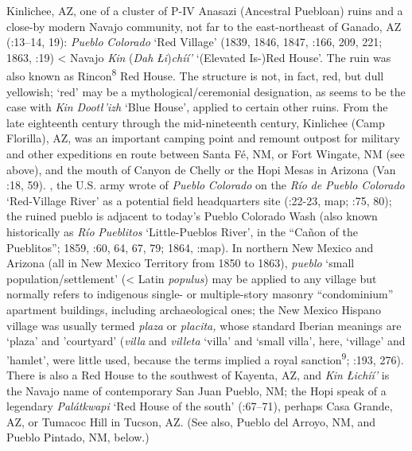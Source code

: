 Kinlichee, AZ, one of a cluster of P-IV Anasazi (Ancestral Puebloan) ruins and a close-by modern Navajo community, not far to the east-northeast of Ganado, AZ (\citealt{BarnesGranger1960}:13–14, 19):  \textit{Pueblo} \textit{Colorado} ‘Red Village’ (1839, 1846, 1847, \citealt{Correll1979}:166, 209, 221; 1863, \citealt{BarnesGranger1960}:19) < Navajo \textit{Kin} (\textit{Dah} \textit{Łi})\textit{chíí'} ‘(Elevated Is-)Red House’.  The ruin was also known as Rincon\textsuperscript{8} Red House.  The structure is not, in fact, red, but dull yellowish; ‘red’ may be a mythological/ceremonial designation, as seems to be the case with \textit{Kin} \textit{Dootł’izh} ‘Blue House’, applied to certain other ruins.  From the late eighteenth century through the mid-nineteenth century, Kinlichee (Camp Florilla), AZ, was an important camping point and remount outpost for military and other expeditions en route between Santa Fé, NM, or Fort Wingate, NM (see above), and the mouth of Canyon de Chelly or the Hopi Mesas in Arizona (Van \citealt{Valkenburgh1999}:18, 59).  \citealt{In1863}, the U.S. army wrote of \textit{Pueblo} \textit{Colorado} on the \textit{Río} \textit{de} \textit{Pueblo} \textit{Colorado} ‘Red-Village River’ as a potential field headquarters site (\citealt{Kelly1970}:22-23, map; \citealt{Trafzer1982}:75, 80); the ruined pueblo is adjacent to today’s Pueblo Colorado Wash (also known historically as \textit{Río} \textit{Pueblitos} ‘Little-Pueblos River’, in the “Cañon of the Pueblitos”; 1859, \citealt{Bailey1964a}:60, 64, 67, 79; 1864, \citealt{Madsen2010}:map).  In northern New Mexico and Arizona (all in New Mexico Territory from 1850 to 1863), \textit{pueblo} ‘small population/settlement’ (< Latin \textit{populus}) may be applied to any village but normally refers to indigenous single- or multiple-story masonry “condominium” apartment buildings, including archaeological ones; the New Mexico Hispano village was usually termed \textit{plaza} or \textit{placita,} whose standard Iberian meanings are ‘plaza’ and ’courtyard’ (\textit{villa} and \textit{villeta} ‘villa’ and ‘small villa’, here, ‘village’ and ’hamlet’, were little used, because the terms implied a royal sanction\textsuperscript{9}; \citealt{Julyan1998}:193, 276).  There is also a Red House to the southwest of Kayenta, AZ, and \textit{Kin} \textit{Łichíí'} is the Navajo name of contemporary San Juan Pueblo, NM; the Hopi speak of a legendary \textit{Palátkwapi} ‘Red House of the south’ (\citealt{Waters1963}:67–71), perhaps Casa Grande, AZ, or Tumacoc Hill in Tucson, AZ.  (See also, Pueblo del Arroyo, NM, and Pueblo Pintado, NM, below.)

